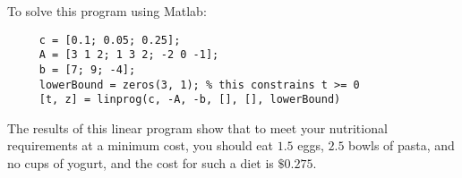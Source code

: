 \vspace{3mm} 

To solve this program using Matlab:
\begin{verbatim}
     c = [0.1; 0.05; 0.25];
     A = [3 1 2; 1 3 2; -2 0 -1];
     b = [7; 9; -4];
     lowerBound = zeros(3, 1); % this constrains t >= 0
     [t, z] = linprog(c, -A, -b, [], [], lowerBound)
\end{verbatim}

The results of this linear program show that to meet your nutritional
requirements at a minimum cost, you should eat $1.5$ eggs, $2.5$ bowls of
pasta, and no cups of yogurt, and the cost for such a diet is $\$0.275$.


